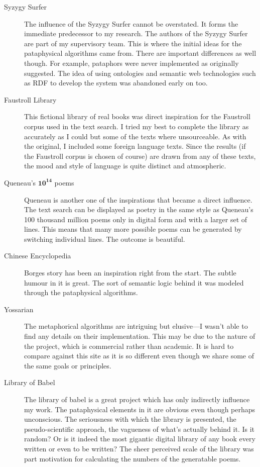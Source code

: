 \begin{description}
  \item[Syzygy Surfer] The influence of the Syzygy Surfer cannot be overstated. It forms the immediate predecessor to my research. The authors of the Syzygy Surfer are part of my supervisory team. This is where the initial ideas for the pataphysical algorithms came from. There are important differences as well though. For example, pataphors were never implemented as originally suggested. The idea of using ontologies and semantic web technologies such as \ac{RDF} to develop the system was abandoned early on too.
  \item[Faustroll Library] This fictional library of real books was direct inspiration for the Faustroll corpus used in the text search. I tried my best to complete the library as accurately as I could but some of the texts where unsourceable. As with the original, I included some foreign language texts. Since the results (if the Faustroll corpus is chosen of course) are drawn from any of these texts, the mood and style of language is quite distinct and atmospheric.
  \item[Queneau's $\bm{10^{14}}$ poems] Queneau is another one of the inspirations that became a direct influence. The text search can be displayed as poetry in the same style as Queneau's \num{100} thousand million poems only in digital form and with a larger set of lines. This means that many more possible poems can be generated by switching individual lines. The outcome is beautiful.
  \item[Chinese Encyclopedia] Borges story has been an inspiration right from the start. The subtle humour in it is great. The sort of semantic logic behind it was modeled through the pataphysical algorithms.
  \item[Yossarian] The metaphorical algorithms are intriguing but elusive---I wasn't able to find any details on their implementation. This may be due to the nature of the project, which is commercial rather than academic. It is hard to compare against this site as it is so different even though we share some of the same goals or principles.
  \item[Library of Babel] The library of babel is a great project which has only indirectly influence my work. The pataphysical elements in it are obvious even though perhaps unconscious. The seriousness with which the library is presented, the pseudo-scientific approach, the vagueness of what's actually behind it. Is it random? Or is it indeed the most gigantic digital library of any book every written or even to be written? The sheer perceived scale of the library was part motivation for calculating the numbers of the generatable poems.

\end{description}
